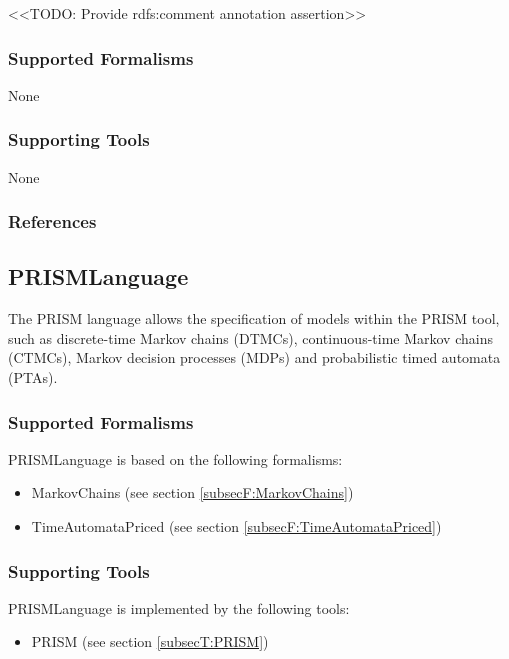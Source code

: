 
<<TODO: Provide rdfs:comment annotation assertion>>

\subsubsection{Supported Formalisms}

None


\subsubsection{Supporting Tools}

None


\subsubsection{References}





\subsection{PRISMLanguage}
\label{subsecL:PRISMLanguage}


The PRISM language allows the specification of models within the PRISM tool, such as discrete-time Markov chains (DTMCs), continuous-time Markov chains (CTMCs), Markov decision processes (MDPs) and probabilistic timed automata (PTAs).

\subsubsection{Supported Formalisms}

PRISMLanguage is based on the following formalisms:
\begin{itemize}
	\item MarkovChains (see section \ref{subsecF:MarkovChains})
	\item TimeAutomataPriced (see section \ref{subsecF:TimeAutomataPriced})
\end{itemize}


\subsubsection{Supporting Tools}

PRISMLanguage is implemented by the following tools:
\begin{itemize}
	\item PRISM (see section \ref{subsecT:PRISM})
\end{itemize}


